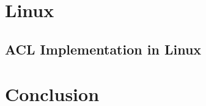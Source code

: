 \documentclass[draft]{article}
\begin{document}
\section*{Linux}

\subsection*{ACL Implementation in Linux}






% 
% 


\section*{Conclusion}
\end{document}
